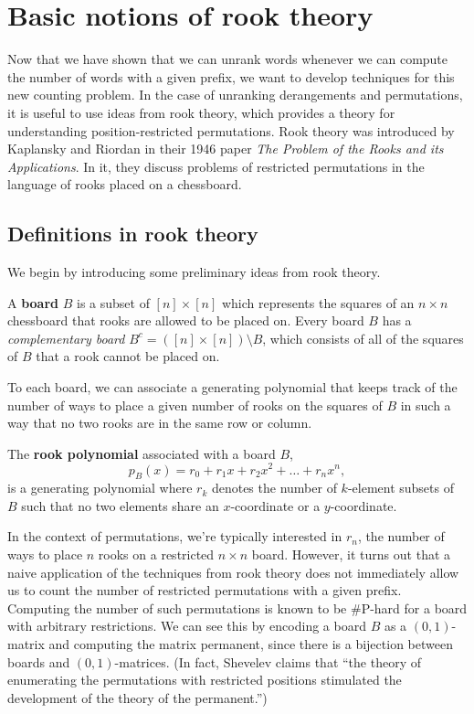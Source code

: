 \section{Basic notions of rook theory}
Now that we have shown that we can unrank words whenever we can compute the
number of words with a given prefix, we want to develop techniques for this new
counting problem.
In the case of unranking derangements and permutations, it is useful to use
ideas from rook theory, which provides a theory for understanding
position-restricted permutations.
Rook theory was introduced by Kaplansky and Riordan \cite{Kaplansky1946}
in their 1946 paper \textit{The Problem of the Rooks and its Applications}. In
it, they discuss problems of restricted permutations in the language of rooks
placed on a chessboard.



\subsection{Definitions in rook theory}
We begin by introducing some preliminary ideas from rook theory.

\begin{definition}
  A \textbf{board} $B$ is a subset of $[n] \times [n]$ which represents the
  squares of an $n \times n$ chessboard that rooks are allowed to be placed on.
  Every board $B$ has a \textit{complementary board}
  $B^c = ([n] \times [n]) \setminus B$, which consists of all of the
  squares of $B$ that a rook cannot be placed on.
\end{definition}

To each board, we can associate a generating polynomial that keeps track of the
number of ways to place a given number of rooks on the squares of $B$ in such a
way that no two rooks are in the same row or column.

\begin{definition}
  The \textbf{rook polynomial} associated with a board $B$,
  \begin{equation}
    p_B(x) = r_0 + r_1 x + r_2 x^2 + \dots + r_n x^n,
  \end{equation}
  is a generating polynomial where $r_k$ denotes the number of $k$-element subsets
  of $B$ such that no two elements share an $x$-coordinate or a $y$-coordinate.
\end{definition}

In the context of permutations, we're typically interested in $r_n$, the number
of ways to place $n$ rooks on a restricted $n \times n$ board.
However, it turns out that a naive application of the techniques from
rook theory does not immediately allow us to count the number of
restricted permutations with a given prefix.
Computing the number of such permutations is known to be \#P-hard
for a board with arbitrary restrictions.
We can see this by encoding a board $B$ as a $(0,1)$-matrix and computing the matrix
permanent, since there is a bijection between boards and $(0,1)$-matrices.
(In fact, Shevelev \cite{Shevelev1992} claims that
``the theory of enumerating the permutations with restricted positions
stimulated the development of the theory of the permanent.'')

